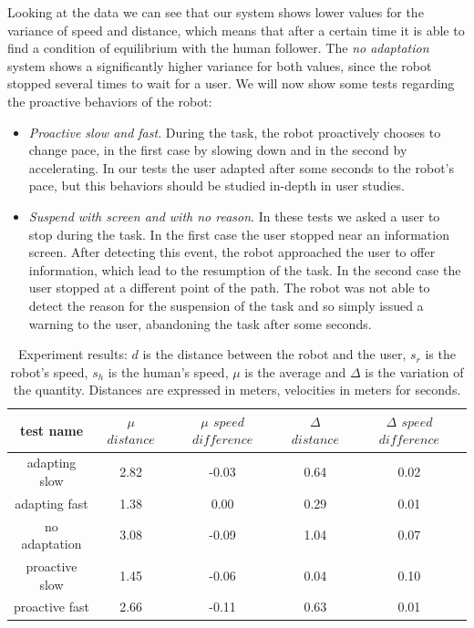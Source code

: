 Looking at the data we can see that our system shows lower values for the variance of speed and distance, which means that after a certain time it is able to find a condition of equilibrium with the human follower. The \textit{no adaptation} system shows a significantly higher variance for both values, since the robot stopped several times to wait for a user. We will now show some tests regarding the proactive behaviors of the robot:

\begin{itemize}
\item \textit{Proactive slow and fast}. During the task, the robot proactively chooses to change pace, in the first case by slowing down and in the second by accelerating. In our tests the user adapted after some seconds to the robot's pace, but this behaviors should be studied in-depth in user studies.
\item \textit{Suspend with screen and with no reason}. In these tests we asked a user to stop during the task. In the first case the user stopped near an information screen. After detecting this event, the robot approached the user to offer information, which lead to the resumption of the task. In the second case the user stopped at a different point of the path. The robot was not able to detect the reason for the suspension of the task and so simply   issued a warning to the user, abandoning the task after some seconds.
\end{itemize}


\begin{table}
\caption[Experiment results on speed adaptation]{Experiment results: $d$ is the distance between the robot and the user, $s_r$ is the robot's speed, $s_h$ is the human's speed, $\mu$ is the average and $\Delta$ is the variation of the quantity. Distances are expressed in meters, velocities in meters for seconds.}
\centering
\begin{tabular}{ | c | c | c | c | c | }

\hline
  test name     & $\mu$ $distance$ & $\mu$ $speed$ $difference$ & $\Delta$ $distance$ & $\Delta$ $speed$ $difference$ \\
\hline
adapting slow & 2.82 & -0.03 & 0.64 & 0.02 \\
  \hline
  adapting fast & 1.38 & 0.00 & 0.29 & 0.01 \\
  \hline
  no adaptation & 3.08 & -0.09 & 1.04 & 0.07 \\
\hline
proactive slow & 1.45 & -0.06 & 0.04 & 0.10 \\
\hline
proactive fast & 2.66 & -0.11 & 0.63 & 0.01 \\
\hline
\end{tabular}
\label{table:case-study-spencer-experiment_results}
\end{table}

